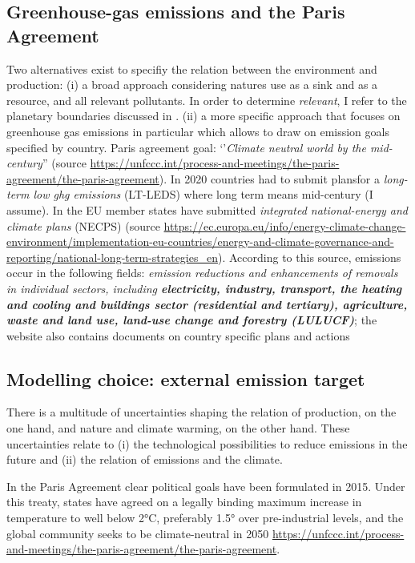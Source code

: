 \subsection{Greenhouse-gas emissions and the Paris Agreement}

Two alternatives exist to specifiy the relation between the environment and production: (i) a broad approach considering natures use as a sink and as a resource, and all relevant pollutants. 
In order to determine \textit{relevant}, I refer to the planetary boundaries discussed in \cite{Rockstrom2009AHumanity}. (ii) a more specific approach that focuses on greenhouse gas emissions in particular which allows to draw on emission goals specified by country. Paris agreement goal: `'\textit{Climate neutral world by the mid-century}'' (source \url{https://unfccc.int/process-and-meetings/the-paris-agreement/the-paris-agreement}). In 2020 countries had to submit plansfor a \textit{long-term low ghg emissions} (LT-LEDS) where long term means mid-century (I assume). In the EU member states have submitted \textit{integrated national-energy and climate plans} (NECPS) (source \url{https://ec.europa.eu/info/energy-climate-change-environment/implementation-eu-countries/energy-and-climate-governance-and-reporting/national-long-term-strategies_en}). According to this source, emissions occur in the following fields: 
\textit{emission reductions and enhancements of removals in individual sectors, including \textbf{electricity, industry, transport, the heating and cooling and buildings sector (residential and tertiary), agriculture, waste and land use, land-use change and forestry (LULUCF)}}; the website also contains documents on country specific plans and actions

\subsection{Modelling choice: external emission target}\label{app:emission_climate_targets}
There is a multitude of uncertainties shaping the relation of production, on the one hand, and nature and climate warming, on the other hand. These uncertainties relate to (i) the technological possibilities to reduce emissions in the future and (ii) the relation of emissions and the climate. 

In the Paris Agreement clear political goals have been formulated in 2015. Under this treaty, states have agreed on a legally binding maximum increase in temperature to well below 2°C, preferably 1.5° over pre-industrial levels, and the global community seeks to be climate-neutral in 2050 \url{https://unfccc.int/process-and-meetings/the-paris-agreement/the-paris-agreement}. 


